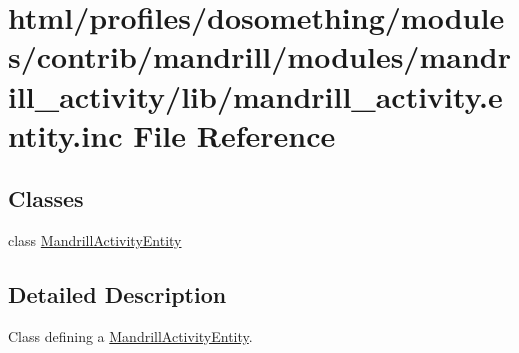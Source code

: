 \hypertarget{mandrill__activity_8entity_8inc}{
\section{html/profiles/dosomething/modules/contrib/mandrill/modules/mandrill\_\-activity/lib/mandrill\_\-activity.entity.inc File Reference}
\label{mandrill__activity_8entity_8inc}
}
\subsection*{Classes}
\begin{DoxyCompactItemize}
\item 
class \hyperlink{classMandrillActivityEntity}{MandrillActivityEntity}
\end{DoxyCompactItemize}


\subsection{Detailed Description}
Class defining a \hyperlink{classMandrillActivityEntity}{MandrillActivityEntity}. 